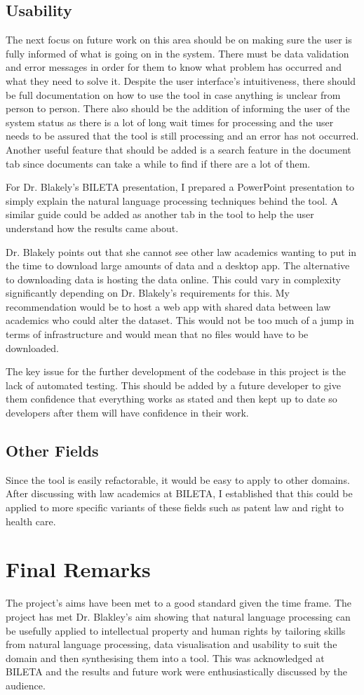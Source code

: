 		\subsection{Usability}
			The next focus on future work on this area should be on making sure the user is fully informed of what is going on in the system. There must be data validation and error messages in order for them to know what problem has occurred and what they need to solve it. Despite the user interface's intuitiveness, there should be full documentation on how to use the tool in case anything is unclear from person to person. There also should be the addition of informing the user of the system status as there is a lot of long wait times for processing and the user needs to be assured that the tool is still processing and an error has not occurred. Another useful feature that should be added is a search feature in the document tab since documents can take a while to find if there are a lot of them.
			
			For Dr. Blakely's BILETA presentation, I prepared a PowerPoint presentation to simply explain the natural language processing techniques behind the tool. A similar guide could be added as another tab in the tool to help the user understand how the results came about.
			
			Dr. Blakely points out that she cannot see other law academics wanting to put in the time to download large amounts of data and a desktop app. The alternative to downloading data is hosting the data online. This could vary in complexity significantly depending on Dr. Blakely's requirements for this. My recommendation would be to host a web app with shared data between law academics who could alter the dataset. This would not be too much of a jump in terms of infrastructure and would mean that no files would have to be downloaded. 

			The key issue for the further development of the codebase in this project is the lack of automated testing. This should be added by a future developer to give them confidence that everything works as stated and then kept up to date so developers after them will have confidence in their work. 
		\subsection{Other Fields}
			Since the tool is easily refactorable, it would be easy to apply to other domains. After discussing with law academics at BILETA, I established that this could be applied to more specific variants of these fields such as patent law and right to health care. 
	\section{Final Remarks}
		The project's aims have been met to a good standard given the time frame. The project has met Dr. Blakley's aim showing that natural language processing can be usefully applied to intellectual property and human rights by tailoring skills from natural language processing, data visualisation and usability to suit the domain and then synthesising them into a tool. This was acknowledged at BILETA and the results and future work were enthusiastically discussed by the audience. 
